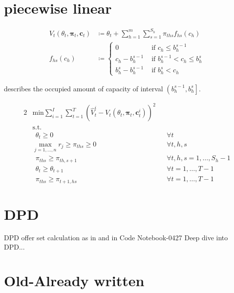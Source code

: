 


\clearpage
\setcounter{page}{1}
\noindent{}

\section{piecewise linear}

\begin{align}
V_t(\theta_t, \boldsymbol{\pi}_t, \boldsymbol{c}_t) & \coloneqq \theta_t + \sum_{h=1}^{m}\sum_{s=1}^{S_h} \pi_{ths} f_{hs}(c_h) \\
f_{hs}(c_h) &\coloneqq 
\begin{cases}\label{def-f}
0 & \text{ if } c_h \leq b_h^{s-1}\\
c_h - b_h^{s-1} & \text{ if } b_h^{s-1} < c_h \leq b_h^s \\
b_h^s - b_h^{s-1} & \text{ if } b_h^s < c_h
\end{cases}
\end{align}

 describes the occupied amount of capacity of interval $\left(b_h^{s-1}, b_h^s\right]$.

\begin{alignat}{2}
& \text{min} \sum_{i=1}^{I}\sum_{t=1}^{T} \left( \hat{V}_t^i - V_t(\theta_t, \boldsymbol{\pi}_t, \boldsymbol{c}_t^i) \right)^2 && \\
& \text{s.t.} && \\
& ~~\theta_t \geq 0 && \forall t\\
& \max_{j=1, \dots, n} r_j \geq \pi_{ths} \geq 0 && \forall t, h, s\\
& ~~\pi_{ths} \geq \pi_{th,s+1} && \forall t, h, s = 1, \dots, S_h-1\\
& ~~\theta_t \geq \theta_{t+1} && \forall t = 1, \dots, T-1\\
& ~~\pi_{ths} \geq \pi_{t+1,hs} && \forall t = 1, \dots, T-1
\end{alignat}

\section{DPD}

DPD offer set calculation as in \cite{Bront.2009} and in Code Notebook-0427 Deep dive into DPD...


\section{Old-Already written}

